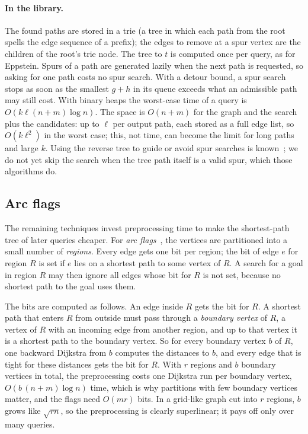 \documentclass[11pt,a4paper]{article}
\begin{document}
\paragraph{In the library.} The found paths are stored in a trie (a tree in which each path from the root spells
the edge sequence of a prefix); the edges to remove at a spur vertex are the children of the root's trie node. The
tree to $t$ is computed once per query, as for Eppstein. Spurs of a path are generated lazily when the next path
is requested, so asking for one path costs no spur search. With a detour bound, a spur search stops as soon as the
smallest $g+h$ in its queue exceeds what an admissible path may still cost. With binary heaps the worst-case
time of a query is $O(k\ell(n+m)\log n)$. The space is $O(n+m)$ for the graph and the search plus the candidates:
up to $\ell$ per output path, each stored as a full edge list, so $O(k\ell^2)$ in the worst case; this, not time,
can become the limit for long paths and large $k$. Using the reverse tree to guide or avoid
spur searches is known~\cite{feng2014,kurz2016}; we do not yet skip the search when the tree path itself is a
valid spur, which those algorithms do.

\subsection{Arc flags}\label{sec:arcflags}
The remaining techniques invest preprocessing time to make the shortest-path tree of later queries cheaper. For
\emph{arc flags}~\cite{lauther2004,moehring2006}, the vertices are partitioned into a small number of
\emph{regions}. Every edge gets one bit per region; the bit of edge $e$ for region $R$ is set if $e$ lies on a
shortest path to some vertex of $R$. A search for a goal in region $R$ may then ignore all edges whose bit for $R$
is not set, because no shortest path to the goal uses them.

The bits are computed as follows. An edge inside $R$ gets the bit for $R$. A shortest path that enters $R$ from
outside must pass through a \emph{boundary vertex} of $R$, a vertex of $R$ with an incoming edge from another
region, and up to that vertex it is a shortest path to the boundary vertex. So for every boundary vertex $b$ of $R$,
one backward Dijkstra from $b$ computes the distances to $b$, and every edge that is tight for these distances
gets the bit for $R$. With $r$ regions and $b$ boundary vertices in total, the preprocessing costs one Dijkstra run
per boundary vertex, $O(b\,(n+m)\log n)$ time, which is why partitions with few boundary vertices matter, and the
flags need $O(mr)$ bits. In a grid-like graph cut into $r$ regions, $b$ grows like $\sqrt{rn}$, so the
preprocessing is clearly superlinear; it pays off only over many queries.
\end{document}
